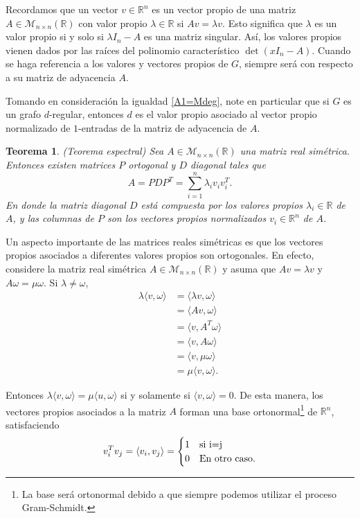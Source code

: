 \documentclass{article}[14pts]
\newtheorem{teorema}{Teorema}
\begin{document}
Recordamos que un vector $v\in \mathbb{R}^{n}$ es un vector propio de una matriz $A\in \mathcal{M}_{n\times n}(\mathbb{R})$ con valor propio $\lambda\in \mathbb{R}$ si $Av=\lambda v$. Esto significa que $\lambda$ es un valor propio si y solo si $\lambda I_{n} - A$ es una matriz singular. Así, los valores propios vienen dados por las raíces del polinomio característico $\det(xI_{n} - A)$. Cuando se haga referencia a los valores y vectores propios de $G$, siempre será con respecto a su matriz de adyacencia $A$.\medskip

Tomando en consideración la igualdad \eqref{A1=Mdeg}, note en particular que si $G$ es un grafo $d$-regular, entonces $d$ es el valor propio asociado al vector propio normalizado de $1$-entradas de la matriz de adyacencia de $A$.

\begin{teorema} (Teorema espectral)
    Sea $A\in\mathcal{M}_{n\times n}(\mathbb{R})$ una matriz real simétrica. Entonces existen matrices $P$ ortogonal y $D$ diagonal tales que
    \begin{equation} \label{Descomposición espectral}
        A = PDP^{T} = \sum_{i=1}^{n}\lambda_{i}v_{i}v_{i}^{T}.
    \end{equation}
    En donde la matriz diagonal $D$ está compuesta por los valores propios $\lambda_i \in\mathbb{R}$ de $A$, y las columnas de $P$ son los vectores propios normalizados $v_{i}\in\mathbb{R}^{n}$ de $A$.
\end{teorema}

Un aspecto importante de las matrices reales simétricas es que los vectores propios asociados a diferentes valores propios son ortogonales. En efecto, considere la matriz real simétrica $A\in\mathcal{M}_{n\times n}(\mathbb{R})$ y asuma que $Av=\lambda v$ y $A\omega = \mu\omega$. Si $\lambda \not= \omega$,
\begin{align*}
    \lambda \langle v,\omega\rangle &= \langle \lambda v,\omega\rangle\\
    &= \langle Av,\omega \rangle\\
    &= \langle v,A^{T} \omega \rangle\\
    &= \langle v,A\omega \rangle\\
    &= \langle v,\mu\omega \rangle\\
    &= \mu \langle v,\omega\rangle.
\end{align*}

Entonces $\lambda \langle v,\omega \rangle = \mu \langle u,\omega \rangle$ si y solamente si $\langle v,\omega\rangle=0$. De esta manera, los vectores propios asociados a la matriz $A$ forman una base ortonormal\footnote{La base será ortonormal debido a que siempre podemos utilizar el proceso Gram-Schmidt.} de $\mathbb{R}^{n}$, satisfaciendo
\begin{equation*}
    v_{i}^{T} v_j = \langle v_i, v_j\rangle = 
    \begin{cases}
        1 & \text{si } $i=j$\\
        0 & \text{En otro caso.}
    \end{cases}
\end{equation*}
\end{document}
